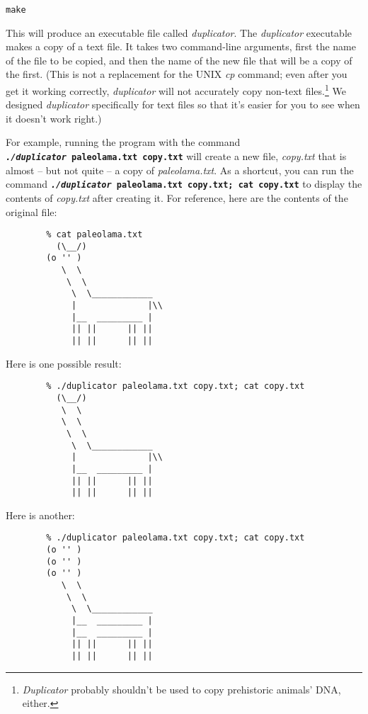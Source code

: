     \texttt{make}

    This will produce an executable file called \textit{duplicator}.
    The \textit{duplicator} executable makes a copy of a text file.
    It takes two command-line arguments, first the name of the file to be copied, and then the name of the new file that will be a copy of the first.
    (This is not a replacement for the UNIX \textit{cp} command;
    even after you get it working correctly, \textit{duplicator} will not accurately copy non-text files.\footnote{\textit{Duplicator} probably shouldn't be used to copy prehistoric animals' DNA, either.}
    We designed \textit{duplicator} specifically for text files so that it's easier for you to see when it doesn't work right.)

    For example, running the program with the command \texttt{\textbf{\textit{./duplicator}~paleolama.txt~copy.txt}} will create a new file, \textit{copy.txt} that is almost -- but not quite -- a copy of \textit{paleolama.txt}.
    As a shortcut, you can run the command \texttt{\textbf{\textit{./duplicator}~paleolama.txt~copy.txt;~cat~copy.txt}} to display the contents of \textit{copy.txt} after creating it.
    For reference, here are the contents of the original file:
\newpage
    \begin{verbatim}
        % cat paleolama.txt
          (\__/)
        (o '' )
           \  \
            \  \
             \  \____________
             |              |\\
             |__  _________ |
             || ||      || ||
             || ||      || ||
    \end{verbatim}

    Here is one possible result:

    \begin{verbatim}
        % ./duplicator paleolama.txt copy.txt; cat copy.txt
          (\__/)
           \  \
           \  \
            \  \
             \  \____________
             |              |\\
             |__  _________ |
             || ||      || ||
             || ||      || ||
    \end{verbatim}

    Here is another:

    \begin{verbatim}
        % ./duplicator paleolama.txt copy.txt; cat copy.txt
        (o '' )
        (o '' )
        (o '' )
           \  \
            \  \
             \  \____________
             |__  _________ |
             |__  _________ |
             || ||      || ||
             || ||      || ||
    \end{verbatim}

